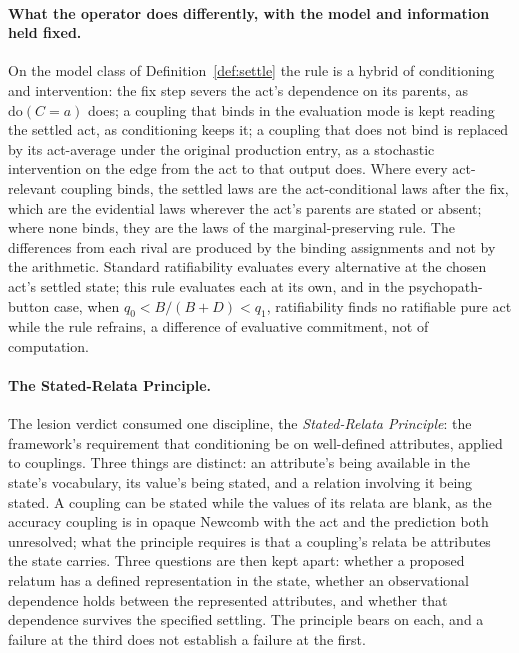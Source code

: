 \paragraph{What the operator does differently, with the model and information held fixed.} On the model class of Definition~\ref{def:settle} the rule is a hybrid of conditioning and intervention: the fix step severs the act's dependence on its parents, as $\mathrm{do}(C = a)$ does; a coupling that binds in the evaluation mode is kept reading the settled act, as conditioning keeps it; a coupling that does not bind is replaced by its act-average under the original production entry, as a stochastic intervention on the edge from the act to that output does. Where every act-relevant coupling binds, the settled laws are the act-conditional laws after the fix, which are the evidential laws wherever the act's parents are stated or absent; where none binds, they are the laws of the marginal-preserving rule. The differences from each rival are produced by the binding assignments and not by the arithmetic. Standard ratifiability evaluates every alternative at the chosen act's settled state; this rule evaluates each at its own, and in the psychopath-button case, when $q_0 < B/(B + D) < q_1$, ratifiability finds no ratifiable pure act while the rule refrains, a difference of evaluative commitment, not of computation.

\paragraph{The Stated-Relata Principle.} The lesion verdict consumed one discipline, the \emph{Stated-Relata Principle}: the framework's requirement that conditioning be on well-defined attributes, applied to couplings. Three things are distinct: an attribute's being available in the state's vocabulary, its value's being stated, and a relation involving it being stated. A coupling can be stated while the values of its relata are blank, as the accuracy coupling is in opaque Newcomb with the act and the prediction both unresolved; what the principle requires is that a coupling's relata be attributes the state carries. Three questions are then kept apart: whether a proposed relatum has a defined representation in the state, whether an observational dependence holds between the represented attributes, and whether that dependence survives the specified settling. The principle bears on each, and a failure at the third does not establish a failure at the first.

